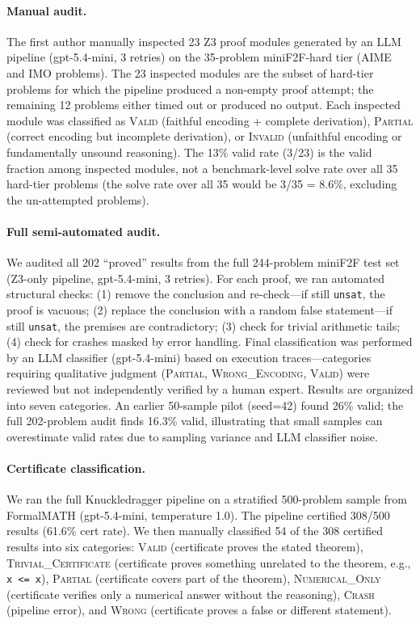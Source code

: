 \documentclass[11pt]{article}
\begin{document}
\paragraph{Manual audit.} The first author manually inspected 23 Z3 proof modules generated by an LLM pipeline (gpt-5.4-mini, 3 retries) on the 35-problem miniF2F-hard tier (AIME and IMO problems). The 23 inspected modules are the subset of hard-tier problems for which the pipeline produced a non-empty proof attempt; the remaining 12 problems either timed out or produced no output. Each inspected module was classified as \textsc{Valid} (faithful encoding + complete derivation), \textsc{Partial} (correct encoding but incomplete derivation), or \textsc{Invalid} (unfaithful encoding or fundamentally unsound reasoning). The 13\% valid rate (3/23) is the valid fraction among inspected modules, not a benchmark-level solve rate over all 35 hard-tier problems (the solve rate over all 35 would be 3/35 = 8.6\%, excluding the un-attempted problems).

\paragraph{Full semi-automated audit.} We audited all 202 ``proved'' results from the full 244-problem miniF2F test set (Z3-only pipeline, gpt-5.4-mini, 3 retries). For each proof, we ran automated structural checks: (1) remove the conclusion and re-check---if still \texttt{unsat}, the proof is vacuous; (2) replace the conclusion with a random false statement---if still \texttt{unsat}, the premises are contradictory; (3) check for trivial arithmetic tails; (4) check for crashes masked by error handling. Final classification was performed by an LLM classifier (gpt-5.4-mini) based on execution traces---categories requiring qualitative judgment (\textsc{Partial}, \textsc{Wrong\_Encoding}, \textsc{Valid}) were reviewed but not independently verified by a human expert. Results are organized into seven categories. An earlier 50-sample pilot (seed=42) found 26\% valid; the full 202-problem audit finds 16.3\% valid, illustrating that small samples can overestimate valid rates due to sampling variance and LLM classifier noise.

\paragraph{Certificate classification.} We ran the full Knuckledragger pipeline on a stratified 500-problem sample from FormalMATH (gpt-5.4-mini, temperature 1.0). The pipeline certified 308/500 results (61.6\% cert rate). We then manually classified 54 of the 308 certified results into six categories: \textsc{Valid} (certificate proves the stated theorem), \textsc{Trivial\_Certificate} (certificate proves something unrelated to the theorem, e.g., \texttt{x <= x}), \textsc{Partial} (certificate covers part of the theorem), \textsc{Numerical\_Only} (certificate verifies only a numerical answer without the reasoning), \textsc{Crash} (pipeline error), and \textsc{Wrong} (certificate proves a false or different statement).
\end{document}
